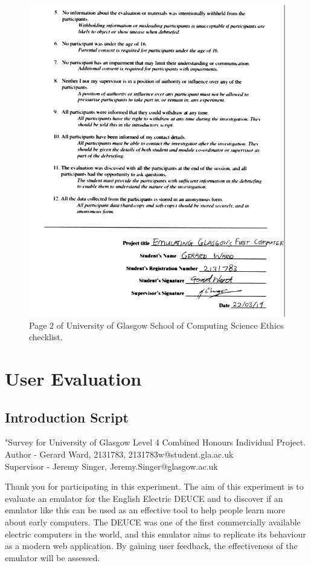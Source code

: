 \documentclass{l4proj}
\begin{document}
\begin{appendices}
\begin{figure}
	\centering
	\includegraphics{images/consent-2}
	\caption{Page 2 of University of Glasgow School of Computing Science Ethics checklist.}
	\label{fig:consent-2}
\end{figure}
	
\chapter{User Evaluation}


\section{Introduction Script}
"Survey for University of Glasgow Level 4 Combined Honours Individual Project. \\
Author - Gerard Ward, 2131783, 2131783w@student.gla.ac.uk \\
Supervisor - Jeremy Singer, Jeremy.Singer@glasgow.ac.uk

Thank you for participating in this experiment. The aim of this experiment is to evaluate an emulator for the English Electric DEUCE and to discover if an emulator like this can be used as an effective tool to help people learn more about early computers. The DEUCE was one of the first commercially available electric computers in the world, and this emulator aims to replicate its behaviour as a modern web application. By gaining user feedback, the effectiveness of the emulator will be assessed.  


\end{appendices}
\end{document}
